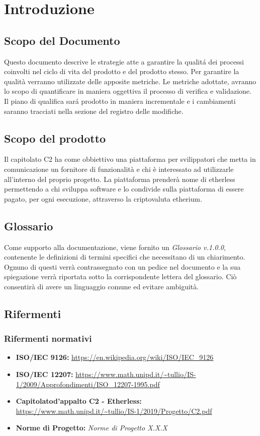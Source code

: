 \section{Introduzione}

\subsection{Scopo del Documento}
Questo documento descrive le strategie atte a garantire la qualit\'a dei processi coinvolti nel ciclo di vita del prodotto e del prodotto stesso. Per garantire la qualità verranno utilizzate delle apposite metriche. Le metriche adottate, avranno lo scopo di quantificare in maniera oggettiva il processo di verifica e validazione. Il piano di qualifica sar\'a prodotto in maniera incrementale e i cambiamenti saranno tracciati nella sezione del registro delle modifiche.

\subsection{Scopo del prodotto}
Il capitolato C2 ha come obbiettivo una piattaforma per svilippatori che metta
in comunicazione un fornitore di funzionalit\`a e chi \`e interessato ad utilizzarle
all'interno del proprio progetto.
La piattaforma prender\`a nome di etherless permettendo a chi sviluppa software e
lo condivide sulla piattaforma di essere pagato, per ogni esecuzione, attraverso
la criptovaluta etherium.


\subsection{Glossario}
Come supporto alla documentazione, viene fornito un \textit{Glossario v.1.0.0},
contenente le definizioni di termini specifici che necessitano di un chiarimento.
Ognuno di questi verr\`a contrassegnato con un pedice \glo nel documento e la sua
spiegazione verr\`a riportata sotto la corrispondente lettera del glossario. Ci\`o
consentir\`a di avere un linguaggio comune ed evitare ambiguit\`a.

\subsection{Rifermenti}
\subsubsection{Rifermenti normativi}
\begin{itemize}
\item \textbf{ISO/IEC 9126:} \url{https://en.wikipedia.org/wiki/ISO/IEC_9126}
\item \textbf{ISO/IEC 12207:} \url{https://www.math.unipd.it/~tullio/IS-1/2009/Approfondimenti/ISO_12207-1995.pdf}
\item \textbf{Capitolato\glo d'appalto C2 - Etherless:} \url{https://www.math.unipd.it/~tullio/IS-1/2019/Progetto/C2.pdf}
\item \textbf{Norme di Progetto:} \textit{Norme di Progetto X.X.X}
\end{itemize}
